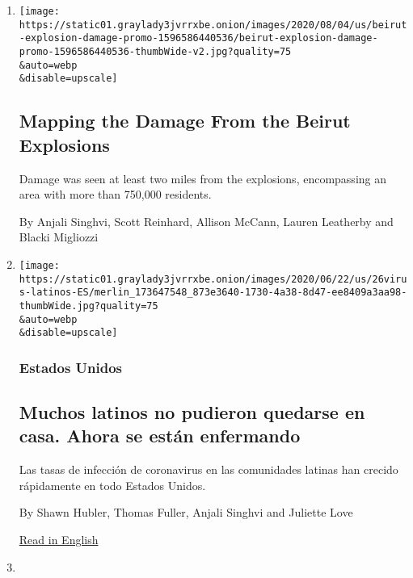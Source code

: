 \begin{enumerate}
\def\labelenumi{\arabic{enumi}.}
\item
  \href{/interactive/2020/08/04/world/middleeast/beirut-explosion-damage.html}{}

  \texttt{[image: https://static01.graylady3jvrrxbe.onion/images/2020/08/04/us/beirut-explosion-damage-promo-1596586440536/beirut-explosion-damage-promo-1596586440536-thumbWide-v2.jpg?quality=75\\\&auto=webp\\\&disable=upscale]}

  \hypertarget{mapping-the-damage-from-the-beirut-explosions}{%
  \subsection{Mapping the Damage From the Beirut
  Explosions}\label{mapping-the-damage-from-the-beirut-explosions}}

  Damage was seen at least two miles from the explosions, encompassing
  an area with more than 750,000 residents.

  By Anjali Singhvi, Scott Reinhard, Allison McCann, Lauren Leatherby
  and Blacki Migliozzi
\item
  \href{/es/2020/06/26/espanol/latinos-coronavirus.html}{}

  \texttt{[image: https://static01.graylady3jvrrxbe.onion/images/2020/06/22/us/26virus-latinos-ES/merlin\_173647548\_873e3640-1730-4a38-8d47-ee8409a3aa98-thumbWide.jpg?quality=75\\\&auto=webp\\\&disable=upscale]}

  \hypertarget{estados-unidos}{%
  \subsubsection{Estados Unidos}\label{estados-unidos}}

  \hypertarget{muchos-latinos-no-pudieron-quedarse-en-casa-ahora-se-estuxe1n-enfermando}{%
  \subsection{Muchos latinos no pudieron quedarse en casa. Ahora se
  están
  enfermando}\label{muchos-latinos-no-pudieron-quedarse-en-casa-ahora-se-estuxe1n-enfermando}}

  Las tasas de infección de coronavirus en las comunidades latinas han
  crecido rápidamente en todo Estados Unidos.

  By Shawn Hubler, Thomas Fuller, Anjali Singhvi and Juliette Love

  \href{https://www.nytimes3xbfgragh.onion/2020/06/26/us/corona-virus-latinos.html}{Read
  in English}
\item
  \href{/2020/06/26/us/corona-virus-latinos.html}{}


\end{enumerate}
